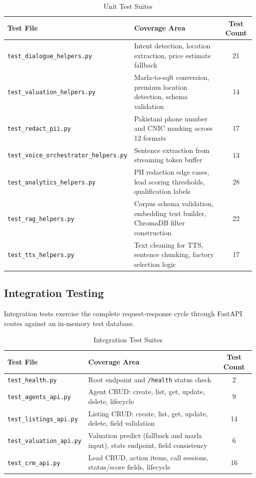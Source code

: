 \begin{table}[H]
\centering
\caption{Unit Test Suites}
\renewcommand{\arraystretch}{1.3}
\begin{tabular}{|l|l|c|}
\hline
\textbf{Test File} & \textbf{Coverage Area} & \textbf{Test Count} \\ \hline
\texttt{test\_dialogue\_helpers.py} & Intent detection, location extraction, price estimate fallback & 21 \\ \hline
\texttt{test\_valuation\_helpers.py} & Marla-to-sqft conversion, premium location detection, schema validation & 14 \\ \hline
\texttt{test\_redact\_pii.py} & Pakistani phone number and CNIC masking across 12 formats & 17 \\ \hline
\texttt{test\_voice\_orchestrator\_helpers.py} & Sentence extraction from streaming token buffer & 13 \\ \hline
\texttt{test\_analytics\_helpers.py} & PII redaction edge cases, lead scoring thresholds, qualification labels & 28 \\ \hline
\texttt{test\_rag\_helpers.py} & Corpus schema validation, embedding text builder, ChromaDB filter construction & 22 \\ \hline
\texttt{test\_tts\_helpers.py} & Text cleaning for TTS, sentence chunking, factory selection logic & 17 \\ \hline
\end{tabular}
\label{tab:unit-tests}
\end{table}

\subsection{Integration Testing}

Integration tests exercise the complete request-response cycle through FastAPI routes against an in-memory test database.

\begin{table}[H]
\centering
\caption{Integration Test Suites}
\renewcommand{\arraystretch}{1.3}
\begin{tabular}{|l|l|c|}
\hline
\textbf{Test File} & \textbf{Coverage Area} & \textbf{Test Count} \\ \hline
\texttt{test\_health.py} & Root endpoint and \texttt{/health} status check & 2 \\ \hline
\texttt{test\_agents\_api.py} & Agent CRUD: create, list, get, update, delete, lifecycle & 9 \\ \hline
\texttt{test\_listings\_api.py} & Listing CRUD: create, list, get, update, delete, field validation & 14 \\ \hline
\texttt{test\_valuation\_api.py} & Valuation predict (fallback and marla input), stats endpoint, field consistency & 6 \\ \hline
\texttt{test\_crm\_api.py} & Lead CRUD, action items, call sessions, status/score fields, lifecycle & 16 \\ \hline
\end{tabular}
\label{tab:integration-tests}
\end{table}

